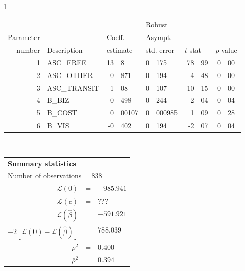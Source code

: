   \begin{tabular}{l}
\begin{tabular}{rlr@{.}lr@{.}lr@{.}lr@{.}l}
         &                       &   \multicolumn{2}{l}{}    & \multicolumn{2}{l}{Robust}  &     \multicolumn{4}{l}{}   \\
Parameter &                       &   \multicolumn{2}{l}{Coeff.}      & \multicolumn{2}{l}{Asympt.}  &     \multicolumn{4}{l}{}   \\
number &  Description                     &   \multicolumn{2}{l}{estimate}      & \multicolumn{2}{l}{std. error}  &   \multicolumn{2}{l}{$t$-stat}  &   \multicolumn{2}{l}{$p$-value}   \\

\hline

1 & ASC\_FREE & 13&8 & 0&175 & 78&99 & 0&00 \\
2 & ASC\_OTHER & -0&871 & 0&194 & -4&48 & 0&00 \\
3 & ASC\_TRANSIT & -1&08 & 0&107 & -10&15 & 0&00 \\
4 & B\_BIZ & 0&498 & 0&244 & 2&04 & 0&04 \\
5 & B\_COST & 0&00107 & 0&000985 & 1&09 & 0&28 \\
6 & B\_VIS & -0&402 & 0&194 & -2&07 & 0&04 \\
\hline

\end{tabular}
\\
\begin{tabular}{rcl}
\multicolumn{3}{l}{\bf Summary statistics}\\
\multicolumn{3}{l}{ Number of observations = $838$} \\
 $\mathcal{L}(0)$ &=&  $-985.941$ \\
 $\mathcal{L}(c)$ &=& ???\\
 $\mathcal{L}(\hat{\beta})$ &=& $-591.921 $  \\
 $-2[\mathcal{L}(0) -\mathcal{L}(\hat{\beta})]$ &=& $788.039$ \\
    $\rho^2$ &=&   $0.400$ \\
    $\bar{\rho}^2$ &=&    $0.394$ \\
\end{tabular}
\end{tabular}

